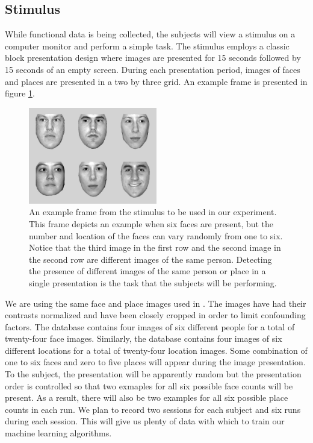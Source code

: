 \documentclass[12pt]{article}
\begin{document}
\subsection{Stimulus}
While functional data is being collected, the subjects will view a stimulus on a computer monitor and perform a simple task.
The stimulus employs a classic block presentation design where images are presented for 15 seconds followed by 15 seconds of an empty screen.
During each presentation period, images of faces and places are presented in a two by three grid.
An example frame is presented in figure \ref{fig:stimulus-frame}.
\begin{figure}
\centering
\includegraphics[width=0.5\textwidth]{figures/stimulus-frame}
\caption{An example frame from the stimulus to be used in our experiment.
This frame depicts an example when six faces are present, but the number and location of the faces can vary randomly from one to six.
Notice that the third image in the first row and the second image in the second row are different images of the same person.
Detecting the presence of different images of the same person or place in a single presentation is the task that the subjects will be performing.}
\label{fig:stimulus-frame}
\end{figure}
We are using the same face and place images used in \cite{Haxby2001}.
The images have had their contrasts normalized and have been closely cropped in order to limit confounding factors.
The database contains four images of six different people for a total of twenty-four face images.
Similarly, the database contains four images of six different locations for a total of twenty-four location images.
Some combination of one to six faces and zero to five places will appear during the image presentation.
To the subject, the presentation will be apparently random but the presentation order is controlled so that two exmaples for all six possible face counts will be present.
As a result, there will also be two examples for all six possible place counts in each run.
We plan to record two sessions for each subject and six runs during each session.
This will give us plenty of data with which to train our machine learning algorithms.
\end{document}
